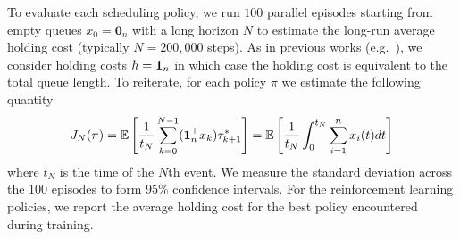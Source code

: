 To evaluate each scheduling policy, we run $100$ parallel episodes starting from empty queues $x_{0} = \mathbf{0}_{n}$ with a long horizon $N$ to estimate the long-run average holding cost (typically $N =200,000$ steps). As in previous works (e.g.~\cite{dai2022queueing, bertsimas2014robust}), we consider holding costs $h = \mathbf{1}_{n}$ in which case the holding cost is equivalent to the total queue length. To reiterate, for each policy $\pi$ we estimate the following quantity 
\begin{equation}
    J_{N}(\pi) = 
  \mathbb{E} \left[\frac{1}{t_{N}}\sum_{k=0}^{N-1} (\mathbf{1}_{n}^{\top}x_{k})\tau^{*}_{k+1} \right]
=  \mathbb{E} \left[\frac{1}{t_{N}} \int^{t_{N}}_{0} \sum_{i=1}^{n} x_{i}(t)dt \right]
\end{equation}
where $t_{N}$ is the time of the $N$th event. We measure the standard deviation across the 100 episodes to form 95\% confidence intervals. For the reinforcement learning policies, we report the average holding cost for the best policy encountered during training.



